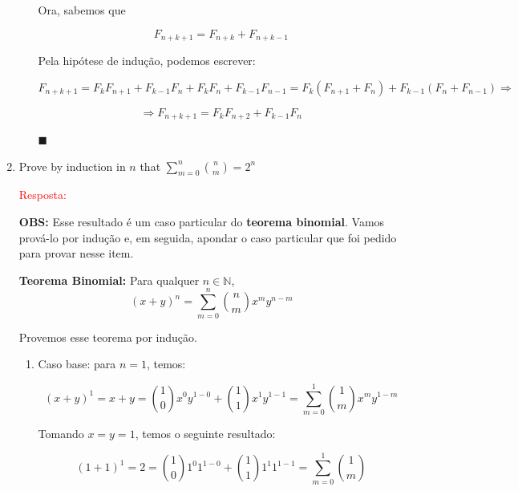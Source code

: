 \documentclass{article}
\newcommand*{\QEDA}{\hfill\ensuremath{\blacksquare}}%
\begin{document}
\begin{enumerate}
\begin{enumerate}[itemsep=0pt, label=(\roman*)]
    Ora, sabemos que 
    
    \begin{equation*}
        F_{n+k+1} = F_{n+k} + F_{n+k-1}
    \end{equation*}
    
    Pela hipótese de indução, podemos escrever: 
    
    \begin{equation*}
        F_{n+k+1} = F_{k}F_{n+1}+F_{k-1}F_{n} + F_{k}F_{n}+F_{k-1}F_{n-1} = F_k(F_{n+1} + F_n) + F_{k-1}(F_n + F_{n-1}) \Rightarrow{}
    \end{equation*}
    
    \begin{equation*}
         \Rightarrow{} F_{n+k+1}= F_kF_{n+2}+F_{k-1}F_n
    \end{equation*}
    
    \QEDA
    
    \end{enumerate}
  
  
  \item Prove by induction in $n$ that \(\sum_{m=0}^{n}{n \choose m}=2^n\)
  
    \textcolor{red}{Resposta: }
    
    \textbf{OBS:} Esse resultado é um caso particular do \textbf{teorema binomial}. Vamos prová-lo por indução e, em seguida, apondar o caso particular que foi pedido para provar nesse item. \newline
    
    \textbf{Teorema Binomial:} Para qualquer $n \in \mathbb{N}$, 
    $$
    (x+y)^{n}=\sum_{m=0}^{n}{n \choose m}x^{m} y^{n-m}
    $$
    
    Provemos esse teorema por indução.
    
    \begin{enumerate}[itemsep=0pt, label=(\roman*)]
    
    \item Caso base: para $n=1$, temos:
    
    \begin{equation*}
        (x+y)^{1}=x+y={1 \choose 0} x^{0} y^{1-0}+{1 \choose 1} x^{1} y^{1-1}=\sum_{m=0}^{1}{1 \choose m} x^{m} y^{1-m}
    \end{equation*}
    
    Tomando $x=y=1$, temos o seguinte resultado: 
    
        \begin{equation*}
        (1+1)^{1}=2={1 \choose 0} 1^{0} 1^{1-0}+{1 \choose 1} 1^{1} 1^{1-1}=\sum_{m=0}^{1}{1 \choose m}
    \end{equation*}
    

\end{enumerate}
\end{enumerate}
\end{document}
